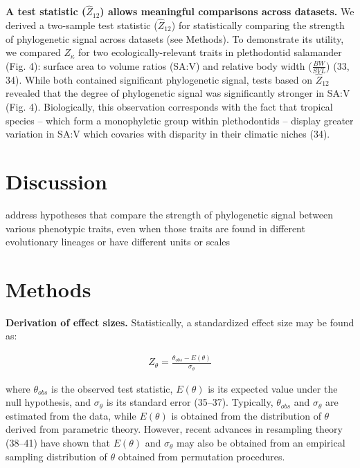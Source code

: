\documentclass[
]{article}
\begin{document}
\textbf{A test statistic (\(\hat{Z}_{12}\)) allows meaningful
comparisons across datasets.} We derived a two-sample test statistic
(\(\hat{Z}_{12}\)) for statistically comparing the strength of
phylogenetic signal across datasets (see Methods). To demonstrate its
utility, we compared \(Z_{\kappa}\) for two ecologically-relevant traits
in plethodontid salamander (Fig. 4): surface area to volume ratios
(SA:V) and relative body width (\(\frac{BW}{SVL}\)) (33, 34). While both
contained significant phylogenetic signal, tests based on
\(\hat{Z}_{12}\) revealed that the degree of phylogenetic signal was
significantly stronger in SA:V (Fig. 4). Biologically, this observation
corresponds with the fact that tropical species -- which form a
monophyletic group within plethodontids -- display greater variation in
SA:V which covaries with disparity in their climatic niches (34).

\hypertarget{discussion}{%
\section{Discussion}\label{discussion}}

address hypotheses that compare the strength of phylogenetic signal
between various phenotypic traits, even when those traits are found in
different evolutionary lineages or have different units or scales

\hypertarget{methods}{%
\section{Methods}\label{methods}}

\textbf{Derivation of effect sizes.} Statistically, a standardized
effect size may be found as:

\begin{align}
    Z_{\theta}=\frac{\theta_{obs}-E(\theta)}{\sigma_\theta}
\end{align}

where \(\theta_{obs}\) is the observed test statistic, \(E(\theta)\) is
its expected value under the null hypothesis, and \(\sigma_\theta\) is
its standard error (35--37). Typically, \(\theta_{obs}\) and
\(\sigma_\theta\) are estimated from the data, while \(E(\theta)\) is
obtained from the distribution of \(\theta\) derived from parametric
theory. However, recent advances in resampling theory (38--41) have
shown that \(E(\theta)\) and \(\sigma_\theta\) may also be obtained from
an empirical sampling distribution of \(\theta\) obtained from
permutation procedures. \hfill\break
\end{document}
